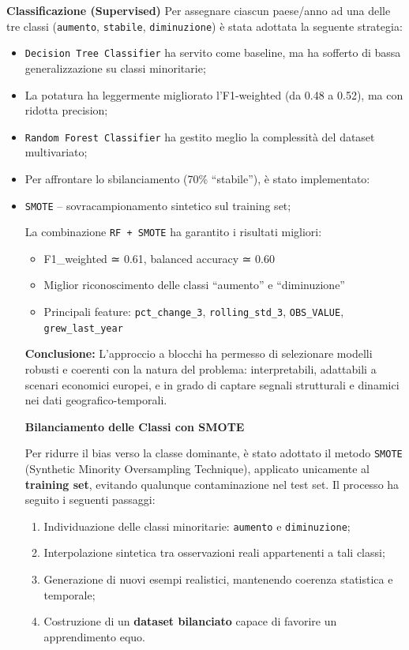 \documentclass[conference]{IEEEtran}
\begin{document}
\vspace{0.5em} \noindent\textbf{Classificazione (Supervised)} Per assegnare ciascun paese/anno ad una delle tre classi (\texttt{aumento}, \texttt{stabile}, \texttt{diminuzione}) è stata adottata la seguente strategia:

\begin{itemize} \item \texttt{Decision Tree Classifier} ha servito come baseline, ma ha sofferto di bassa generalizzazione su classi minoritarie; \item La potatura ha leggermente migliorato l’F1-weighted (da 0.48 a 0.52), ma con ridotta precision; \item \texttt{Random Forest Classifier} ha gestito meglio la complessità del dataset multivariato; \item Per affrontare lo sbilanciamento (70\% “stabile”), è stato implementato:  \item \texttt{SMOTE} – sovracampionamento sintetico sul training set; 

La combinazione \texttt{RF + SMOTE} ha garantito i risultati migliori:

\begin{itemize} 
  \item F1\_weighted ≃ 0.61, balanced accuracy ≃ 0.60 
  \item Miglior riconoscimento delle classi “aumento” e “diminuzione” 
  \item Principali feature: \texttt{pct\_change\_3}, \texttt{rolling\_std\_3}, \texttt{OBS\_VALUE}, \texttt{grew\_last\_year} 
\end{itemize}
\vspace{0.8em} \noindent\textbf{Conclusione:} L’approccio a blocchi ha permesso di selezionare modelli robusti e coerenti con la natura del problema: interpretabili, adattabili a scenari economici europei, e in grado di captare segnali strutturali e dinamici nei dati geografico-temporali.




\noindent\textbf{Bilanciamento delle Classi con SMOTE}

Per ridurre il bias verso la classe dominante, è stato adottato il metodo \texttt{SMOTE} (Synthetic Minority Oversampling Technique), applicato unicamente al \textbf{training set}, evitando qualunque contaminazione nel test set. Il processo ha seguito i seguenti passaggi:

\begin{enumerate} \item Individuazione delle classi minoritarie: \texttt{aumento} e \texttt{diminuzione}; \item Interpolazione sintetica tra osservazioni reali appartenenti a tali classi; \item Generazione di nuovi esempi realistici, mantenendo coerenza statistica e temporale; \item Costruzione di un \textbf{dataset bilanciato} capace di favorire un apprendimento equo. \end{enumerate}


\end{itemize}
\end{document}
